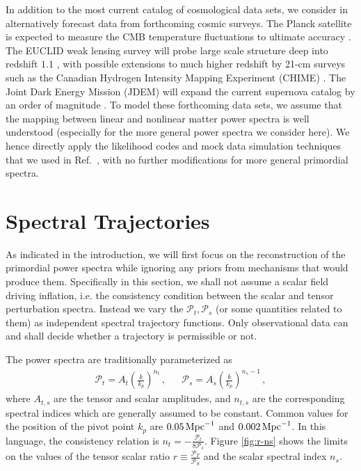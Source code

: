 \documentclass[a4paper,11pt]{article}
\def\mpc{{\rm\,Mpc}}
\def\mpc{{\rm\,Mpc}}
\newcommand{\pscalar}{{\mathcal{P}_s}}
\newcommand{\ptensor}{{\mathcal{P}_t}}
\begin{document}
In addition to the most current catalog of cosmological data sets, we
consider in alternatively forecast data from forthcoming cosmic
surveys. The Planck satellite is expected to measure the CMB
temperature fluctuations to ultimate
accuracy \cite{book_PlanckBlue}. The EUCLID weak lensing survey will
probe large scale structure deep into redshift
$1.1$ \cite{book_EUCLIDYellow}, with possible extensions to much
higher redshift by 21-cm surveys such as the Canadian Hydrogen
Intensity Mapping Experiment (CHIME) \cite{book_CHIMEWhite}. The Joint
Dark Energy Mission (JDEM) will expand the current supernova catalog
by an order of magnitude \cite{DETF}. To model these forthcoming data
sets, we assume that the mapping between linear and nonlinear matter
power spectra is well understood (especially for the more general
power spectra we consider here). We hence directly apply the
likelihood codes and mock data simulation techniques that we used in
Ref.~\cite{HBK2010}, with no further modifications for more general
primordial spectra.

\section{Spectral Trajectories}\label{sec:spectral_trajectories}
As indicated in the introduction, we will first focus on the
reconstruction of the primordial power spectra while ignoring any
priors from mechanisms that would produce them. Specifically in this
section, we shall not assume a scalar field driving inflation,
i.e. the consistency condition between the scalar and tensor
perturbation spectra. Instead we vary the $\ptensor,
\pscalar$ (or some quantities related to them) as independent
spectral trajectory functions. Only observational data can and shall
decide whether a trajectory is permissible or not.

The power spectra are traditionally parameterized as
\begin{eqnarray}
  \ptensor=A_t \left(\frac{k}{k_p}\right)^{n_t}\, ,&& \pscalar=A_s\left(\frac{k}{k_p}\right)^{n_s-1}\, ,
\end{eqnarray}
where $A_{t, s}$ are the tensor and scalar amplitudes, and $n_{t, s}$
are the corresponding spectral indices which are generally assumed to
be constant. Common values for the position of the pivot point $k_{p}$
are $0.05\mpc^{-1}$ and $0.002\mpc^{-1}$. In this language, the
consistency relation is
$n_t=-\frac{\ptensor}{8\pscalar}$. Figure \ref{fig:r-ns}
shows the limits on the values of the tensor scalar ratio
$r\equiv\frac{\mathcal{P}_T}{\mathcal{P}_S}$ and the scalar spectral
index $n_s$. 
\end{document}
